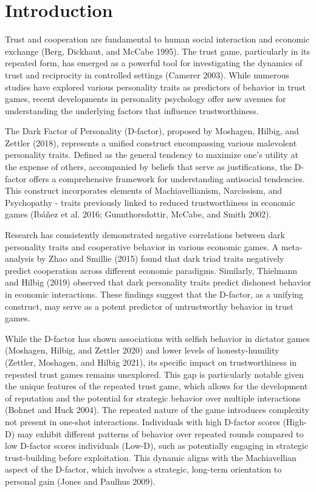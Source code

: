 \documentclass[
]{article}
\begin{document}
\pagebreak

\section{Introduction}\label{introduction}

Trust and cooperation are fundamental to human social interaction and economic exchange (Berg, Dickhaut, and McCabe 1995). The trust game, particularly in its repeated form, has emerged as a powerful tool for investigating the dynamics of trust and reciprocity in controlled settings (Camerer 2003). While numerous studies have explored various personality traits as predictors of behavior in trust games, recent developments in personality psychology offer new avenues for understanding the underlying factors that influence trustworthiness.

The Dark Factor of Personality (D-factor), proposed by Moshagen, Hilbig, and Zettler (2018), represents a unified construct encompassing various malevolent personality traits. Defined as the general tendency to maximize one's utility at the expense of others, accompanied by beliefs that serve as justifications, the D-factor offers a comprehensive framework for understanding antisocial tendencies. This construct incorporates elements of Machiavellianism, Narcissism, and Psychopathy - traits previously linked to reduced trustworthiness in economic games (Ibáñez et al. 2016; Gunnthorsdottir, McCabe, and Smith 2002).

Research has consistently demonstrated negative correlations between dark personality traits and cooperative behavior in various economic games. A meta-analysis by Zhao and Smillie (2015) found that dark triad traits negatively predict cooperation across different economic paradigms. Similarly, Thielmann and Hilbig (2019) observed that dark personality traits predict dishonest behavior in economic interactions. These findings suggest that the D-factor, as a unifying construct, may serve as a potent predictor of untrustworthy behavior in trust games.

While the D-factor has shown associations with selfish behavior in dictator games (Moshagen, Hilbig, and Zettler 2020) and lower levels of honesty-humility (Zettler, Moshagen, and Hilbig 2021), its specific impact on trustworthiness in repeated trust games remains unexplored. This gap is particularly notable given the unique features of the repeated trust game, which allows for the development of reputation and the potential for strategic behavior over multiple interactions (Bohnet and Huck 2004).
The repeated nature of the game introduces complexity not present in one-shot interactions. Individuals with high D-factor scores (High-D) may exhibit different patterns of behavior over repeated rounds compared to low D-factor scores individuals (Low-D), such as potentially engaging in strategic trust-building before exploitation. This dynamic aligns with the Machiavellian aspect of the D-factor, which involves a strategic, long-term orientation to personal gain (Jones and Paulhus 2009).
\end{document}
